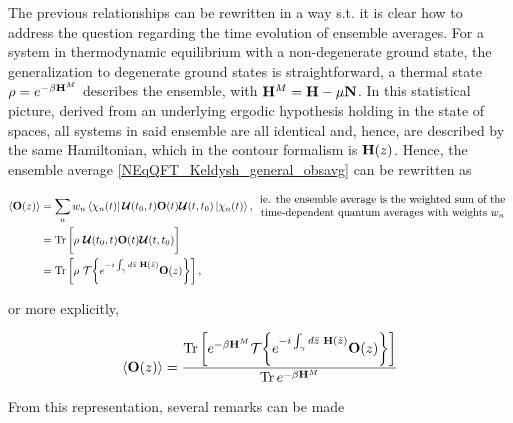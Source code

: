 The previous relationships can be rewritten in a way s.t. it is clear how to address the question regarding the time evolution of ensemble averages. 
For a system in thermodynamic equilibrium with a non-degenerate ground state, the generalization to degenerate ground states is straightforward, a thermal state $\rho = e^{-\beta {\bf H}^M}$ describes the ensemble, with ${\bf H}^M = {\bf H} - \mu {\bf N}$. 
In this statistical picture, derived from an underlying ergodic hypothesis holding in the state of spaces, all systems in said ensemble are all identical and, hence, are described by the same Hamiltonian, which in the contour formalism is ${\bf H}(z)$.
Hence, the ensemble average \cref{NEqQFT_Keldysh_general_obsavg} can be rewritten as 

\begin{equation}
    \begin{split}
        \langle {\bf O}(z) \rangle &= \sum_{n} w_n \bra{\chi_n(t)} \bm{\mathcal{U}}(t_0, t) {\bf O}(t) \bm{\mathcal{U}}(t, t_0) \ket{\chi_n(t)}, \begin{array}{cc}
             \textnormal{ie. the ensemble average is the weighted sum of the}  \\
             \textnormal{time-dependent quantum averages with weights $w_n$}
        \end{array}\\
        &= \Tr \bigg[ 
            \rho \textnormal{ } \bm{\mathcal{U}}(t_0, t) {\bf O}(t) \bm{\mathcal{U}}(t, t_0)
        \bigg] \\
        &=  \Tr \left[
            \rho \textnormal{ } \mathcal{T} \bigg\{
            e^{-i \int_{\gamma} d\bar{z} \textnormal{ } {\bf H}(\bar{z})} {\bf O}(z) 
        \bigg\}
        \right],
    \end{split}
\end{equation}

or more explicitly, 

\begin{equation}
     \langle {\bf O}(z) \rangle = \frac{\Tr \bigg[ e^{-\beta {\bf H}^M} \mathcal{T} \bigg\{
            e^{-i \int_{\gamma} d\bar{z} \textnormal{ } {\bf H}(\bar{z})} {\bf O}(z) 
        \bigg\}\bigg]}{\Tr e^{-\beta {\bf H}^M} }
\end{equation}

From this representation, several remarks can be made

\begin{remark}
\end{remark}


